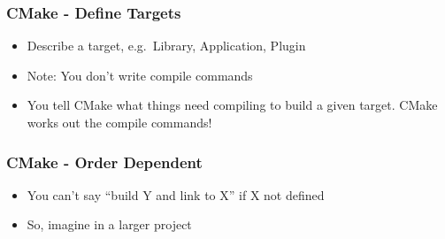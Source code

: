 \subsubsection{CMake - Define Targets}\label{cmake---define-targets}

\begin{itemize}
\itemsep1pt\parskip0pt
\item
  Describe a target, e.g.~Library, Application, Plugin
\end{itemize}

\begin{Shaded}
\begin{Highlighting}[]
\end{Highlighting}
\end{Shaded}

\begin{itemize}
\itemsep1pt\parskip0pt
\item
  Note: You don't write compile commands
\item
  You tell CMake what things need compiling to build a given target.
  CMake works out the compile commands!
\end{itemize}

\subsubsection{CMake - Order Dependent}\label{cmake---order-dependent}

\begin{itemize}
\itemsep1pt\parskip0pt
\item
  You can't say ``build Y and link to X'' if X not defined
\item
  So, imagine in a larger project
\end{itemize}

\begin{Shaded}
\begin{Highlighting}[]
\NormalTok{)}
\end{Highlighting}
\end{Shaded}

